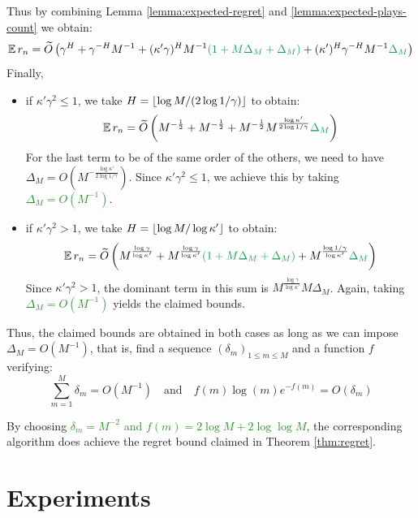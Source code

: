 \documentclass[runningheads]{llncs}
\newcommand{\diff}[1]{\textcolor{ForestGreen}{#1}}
\begin{document}
Thus by combining Lemma \ref{lemma:expected-regret} and \ref{lemma:expected-plays-count} we obtain:
\begin{equation*}
    \expectedvalue r_n = \tilde{O}\left(\gamma^H + \gamma^{-H}M^{-1} + (\kappa' \gamma)^{H}M^{-1}\diff{(1+M\Delta_M+\Delta_M)} + (\kappa')^H\gamma^{-H}M^{-1}\diff{\Delta_M}\right)
\end{equation*}
Finally,
\begin{itemize}
    \item if $\kappa'\gamma^2 \leq 1$, we take $H = \lfloor\log M / (2\log 1/\gamma)\rfloor$ to obtain:
    \begin{equation*}
        \expectedvalue r_n = \tilde{O}\left(M^{-\frac{1}{2}} + M^{-\frac{1}{2}} + M^{-\frac{1}{2}}M^{\frac{\log \kappa'}{2\log 1/\gamma}} \diff{\Delta_M}\right)
    \end{equation*}
    For the last term to be of the same order of the others, we need to have $\Delta_M = O(M^{-\frac{\log \kappa'}{2\log 1/\gamma}})$. Since $\kappa'\gamma^2 \leq 1$, we achieve this by taking \diff{$\Delta_M = O(M^{-1})$}.
    \item if $\kappa'\gamma^2 > 1$, we take $H = \lfloor\log M / \log \kappa'\rfloor$ to obtain:
    \begin{equation*}
        \expectedvalue r_n = \tilde{O}\left(M^{\frac{\log \gamma}{\log \kappa'}} + M^{\frac{\log \gamma}{\log \kappa'}}\diff{(1+M\Delta_M+\Delta_M)} + M^{\frac{\log 1/\gamma}{\log \kappa'}}\diff{\Delta_M}\right)
    \end{equation*}
    Since $\kappa'\gamma^2 > 1$, the dominant term in this sum is $M^{\frac{\log \gamma}{\log \kappa'}}M\Delta_M$. Again, taking \diff{$\Delta_M = O(M^{-1})$} yields the claimed bounds.
\end{itemize}
Thus, the claimed bounds are obtained in both cases as long as we can impose $\Delta_M = O(M^{-1})$, that is, find a sequence $(\delta_m)_{1\leq m\leq M}$ and a function $f$ verifying:
\begin{equation}
    \sum_{m=1}^M \delta_m = O(M^{-1})\quad \text{and}\quad f(m)\log (m) e^{-f(m)} = O(\delta_m)
\end{equation}

By choosing \diff{$\delta_m = M^{-2}$ and $f(m) = 2 \log M + 2 \log\log M$}, the corresponding \KLOLOP algorithm does achieve the regret bound claimed in Theorem \ref{thm:regret}.


\section{Experiments}
\label{sec:experiments}
\end{document}
